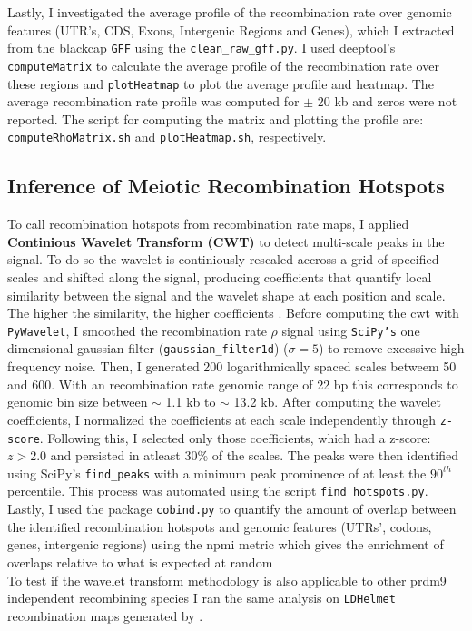 \documentclass[12pt,a4paper]{article}
\begin{document}
Lastly, I investigated the average profile of the recombination rate over
genomic features (UTR's, CDS, Exons, Intergenic Regions and Genes), which I
extracted from the blackcap \texttt{GFF} using the \texttt{clean\_raw\_gff.py}.
I used deeptool's \texttt{computeMatrix} to calculate the average profile of
the recombination rate over these regions and \texttt{plotHeatmap} to plot the
average profile and heatmap. The average recombination rate profile was
computed for $\pm$ 20 kb and zeros were not reported. The script for computing
the matrix and plotting the profile are:
\texttt{computeRhoMatrix.sh} and
\texttt{plotHeatmap.sh}, respectively.

\subsection{Inference of Meiotic Recombination Hotspots}
To call recombination hotspots from recombination rate maps, I applied
\textbf{Continious Wavelet Transform (CWT)} to detect multi-scale peaks in the
signal. To do so the wavelet is continiously rescaled accross a grid of
specified scales and shifted along the signal, producing coefficients that
quantify local similarity between the signal and the wavelet shape at each
position and scale. The higher the similarity, the higher coefficients
\parencite{Singh2022, Mexican-hat-wavelet}. Before computing the cwt with
\texttt{PyWavelet}, I smoothed the recombination rate $\rho$ signal using
\texttt{SciPy's} one dimensional gaussian filter (\texttt{gaussian_filter1d})
($\sigma = 5$) to remove excessive high frequency noise. Then, I generated 200
logarithmically spaced scales betweem 50 and 600. With an recombination rate
genomic range of 22 bp this corresponds to genomic bin size between $\sim$ 1.1
kb to $\sim$ 13.2 kb. After computing the wavelet coefficients, I normalized
the coefficients at each scale independently through \texttt{z-score}.
Following this, I selected only those coefficients, which had a z-score: $z >
	2.0$ and persisted in atleast 30\% of the scales. The peaks were then
identified using SciPy's \texttt{find_peaks} with a minimum peak prominence of
at least the $90^{th}$ percentile. This process was automated using the script
\texttt{find_hotspots.py}. Lastly, I used the package \texttt{cobind.py} to
quantify the amount of overlap between the identified recombination hotspots
and genomic features (UTRs', codons, genes, intergenic regions) using the npmi metric which gives
the enrichment of overlaps relative to what is expected at random \parencite{ma_cobind_2023} \\
To test if the wavelet transform methodology is
also applicable to other prdm9 independent recombining species I ran the same
analysis on \texttt{LDHelmet} recombination maps generated by \cite{singhal_2015}.
\end{document}
